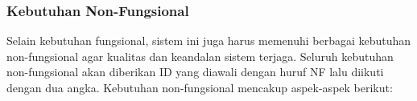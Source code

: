 


\subsubsection{Kebutuhan Non-Fungsional}

Selain kebutuhan fungsional, sistem ini juga harus memenuhi berbagai kebutuhan non-fungsional agar kualitas dan keandalan sistem terjaga. Seluruh kebutuhan non-fungsional akan diberikan ID yang diawali dengan huruf NF lalu diikuti dengan dua angka. Kebutuhan non-fungsional mencakup aspek-aspek berikut:


